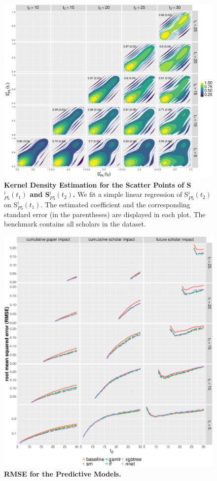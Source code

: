 \begin{refsection}
\begin{figure}[ht!]
    \centering
    \includegraphics[width=\textwidth]{figures/pred_power/scatter_autrp_all.eps}
    \caption{{\bf Kernel Density Estimation for the Scatter Points of S$_{P5}^{i}(t_1)$ and S$_{P5}^{i}(t_2)$.}
    We fit a simple linear regression of S$_{P5}^{i}(t_2)$ on S$_{P5}^{i}(t_1)$. The estimated coefficient and the corresponding standard error (in the parentheses) are displayed in each plot. The benchmark contains all scholars in the dataset.}
    \label{fig:scatter_autrp_all}
\end{figure}


\begin{figure}[ht!]
    \centering
    \includegraphics[width=\textwidth]{figures/pred_model/rmse.eps}
    \caption{{\bf RMSE for the Predictive Models.}}
    \label{fig:pred_rmse}
\end{figure}


\end{refsection}
